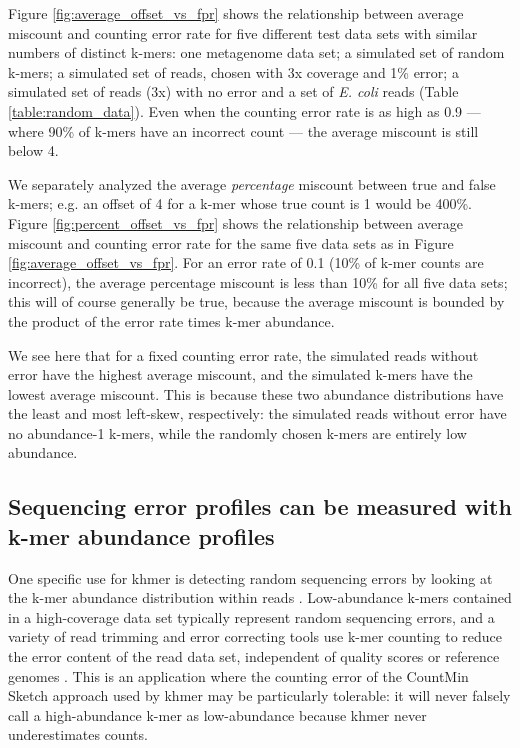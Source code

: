 \documentclass[10pt]{article}
\begin{document}
Figure \ref{fig:average_offset_vs_fpr} shows the relationship between
average miscount and counting error rate for five different test data
sets with similar numbers of distinct k-mers: one metagenome data
set; a simulated set of random k-mers; a simulated set of reads,
chosen with 3x coverage and 1\% error; a simulated set of reads (3x)
with no error and a set of {\em E. coli} reads (Table \ref{table:random_data}).  
Even when the counting error rate is as high as 0.9 ---
where 90\% of k-mers have an incorrect count --- the average miscount is still
below 4.

We separately analyzed the average {\em percentage} miscount between
true and false k-mers; e.g. an offset of 4 for a k-mer whose true
count is 1 would be 400\%.  Figure \ref{fig:percent_offset_vs_fpr} shows 
the relationship between average miscount and counting error rate for 
the same five data sets as in Figure \ref{fig:average_offset_vs_fpr}.  
For an error rate of 0.1 (10\% of k-mer counts are incorrect), 
the average percentage miscount is less than 10\% for all five data 
sets; this will of course generally be true, 
because the average miscount is bounded by the product of the error 
rate times k-mer abundance.

We see here that for a fixed counting error rate, the simulated reads
without error have the highest average miscount, and the simulated
k-mers have the lowest average miscount.  This is because these two
abundance distributions have the least and most left-skew,
respectively: the simulated reads without error have no abundance-1
k-mers, while the randomly chosen k-mers are entirely low abundance.

\subsection*{Sequencing error profiles can be measured with k-mer abundance
profiles}

One specific use for khmer is detecting random sequencing errors by
looking at the k-mer abundance distribution within reads \cite{Medvedev2011}.
Low-abundance k-mers contained in a high-coverage data set typically
represent random sequencing errors, and a variety of read trimming and
error correcting tools use k-mer counting to reduce the error content
of the read data set, independent of quality scores or reference
genomes \cite{Kelley2010}.  This is an application where the counting
error of the CountMin Sketch approach used by khmer may be
particularly tolerable: it will never falsely call a high-abundance k-mer 
as low-abundance because khmer never underestimates counts.
\end{document}
